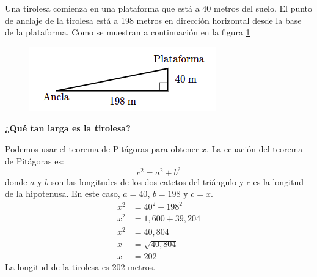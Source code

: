Una tirolesa comienza en una plataforma que está a 40 metros del suelo.
El punto de anclaje de la tirolesa está a 198 metros en dirección horizontal desde la base de la plataforma.
Como se muestran a continuación en la figura \ref{fig:proverb_pitagoras_03}
\begin{figure}[H]
    \centering
    \includegraphics[width=0.3\linewidth]{../images/proverb_pitagoras_03.png}
    \caption{}
    \label{fig:proverb_pitagoras_03}
\end{figure}
\textbf{¿Qué tan larga es la tirolesa?}

\begin{solutionbox}{10cm}
    Podemos usar el teorema de Pitágoras para obtener $x$.
    La ecuación del teorema de Pitágoras es:
    \[c^2=a^2+b^2\]
    donde $a$ y $b$ son las longitudes de los dos catetos del triángulo y $c$ es la longitud de la hipotenusa.
    En este caso, $a=40$, $b=198$ y $c=x$.
    \begin{align*}
        x^2 & =40^2+198^2     \\
        x^2 & =1,600 + 39,204 \\
        x^2 & =40,804         \\
        x   & =\sqrt{40,804}  \\
        x   & = 202
    \end{align*}
    La longitud de la tirolesa es 202 metros.
\end{solutionbox}